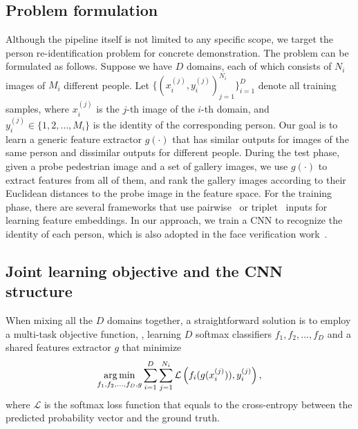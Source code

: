 \subsection{Problem formulation} %
\label{sub:problem_formulation}

Although the pipeline itself is not limited to any specific scope, we target the person re-identification problem for concrete demonstration. The problem can be formulated as follows. Suppose we have $D$ domains, each of which consists of $N_i$ images of $M_i$ different people. Let $\{(x_i^{(j)}, y_i^{(j)})_{j=1}^{N_i}\}_{i=1}^{D}$ denote all training samples, where $x_i^{(j)}$ is the $j$-th image of the $i$-th domain, and $y_i^{(j)} \in \{1,2,\dots,M_i\}$ is the identity of the corresponding person. Our goal is to learn a generic feature extractor $g(\cdot)$ that has similar outputs for images of the same person and dissimilar outputs for different people. During the test phase, given a probe pedestrian image and a set of gallery images, we use $g(\cdot)$ to extract features from all of them, and rank the gallery images according to their Euclidean distances to the probe image in the feature space. For the training phase, there are several frameworks that use pairwise~\cite{li2014deepreid,ahmed2015improved} or triplet~\cite{schroff2015facenet} inputs for learning feature embeddings. In our approach, we train a CNN to recognize the identity of each person, which is also adopted in the face verification work~\cite{sun2014deep}.


\subsection{Joint learning objective and the CNN structure} %
\label{sub:joint_learning_and_cnn_structure}

When mixing all the $D$ domains together, a straightforward solution is to employ a multi-task objective function, \ie, learning $D$ softmax classifiers $f_1, f_2, \dots, f_D$ and a shared features extractor $g$ that minimize
\begin{equation} \label{eq:multi-task-objfunc}
    \mathop{\mathrm{arg\,min}}_{f_1,f_2,\dots,f_D,g} \sum_{i=1}^D \sum_{j=1}^{N_i} \mathcal{L}\left( f_i(g(x_i^{(j)})), y_i^{(j)} \right),
\end{equation}
where $\mathcal{L}$ is the softmax loss function that equals to the cross-entropy between the predicted probability vector and the ground truth.

